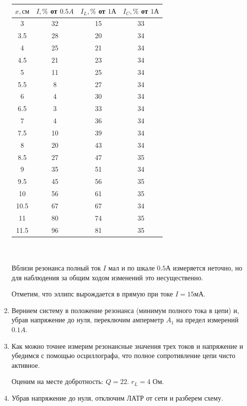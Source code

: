 \documentclass[a4paper, 12pt]{article}
\begin{document}
\begin{enumerate}
    \begin{tabular}{|c|c|c|c|}
        \hline
        $x, см$ & $I, \%$ от $0.5 A$ & $I_L, \%$ от $1 А$ & $I_C, \%$ от $1 А$ \\ \hline
        3 & 32 & 15 & 33 \\ \hline
        3.5 & 28 & 20 & 34 \\ \hline
        4 & 25 & 21 & 34 \\ \hline
        4.5 & 21 & 23 & 34 \\ \hline
        5 & 11 & 25 & 34 \\ \hline
        5.5 & 8 & 27 & 34 \\ \hline
        6 & 4 & 30 & 34 \\ \hline
        6.5 & 3 & 33 & 34 \\ \hline
        7 & 4 & 36 & 34 \\ \hline
        7.5 & 10 & 39 & 34 \\ \hline
        8 & 20 & 43 & 34 \\ \hline
        8.5 & 27 & 47 & 35 \\ \hline
        9 & 35 & 51 & 34 \\ \hline
        9.5 & 45 & 56 & 35 \\ \hline
        10 & 56 & 61 & 35 \\ \hline
        10.5 & 67 & 67 & 34 \\ \hline
        11 & 80 & 74 & 35 \\ \hline
        11.5 & 96 & 81 & 35 \\ \hline
    \end{tabular}
    \\\\
    Вблизи резонанса полный ток $I$ мал и по шкале $0.5 А$ измеряется неточно, но для наблюдения за общим ходом изменений это несущественно.

    Отметим, что эллипс вырождается в прямую при токе $I = 15 мА$.

    \item Вернием систему в положение резонанса (минимум полного тока в цепи) и, убрав напряжение до нуля, переключим амперметр $A_1$ на предел измерений $0.1 A$.
    
    \item Как можно точнее измерим резонансные значения трех токов и напряжение и убедимся с помощью осциллографа, что полное сопротивление цепи чисто активное.
    
    Оценим на месте добротность: $Q = 22$. $r_L = 4$ Ом.

    \item Убрав напряжение до нуля, отключим ЛАТР от сети и разберем схему.
\end{enumerate}
\end{document}
